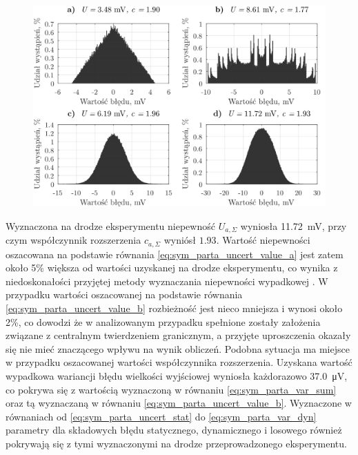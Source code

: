 \begin{figure}[htb!]
\begin{center}
\includegraphics{obrazki/hist_part_a}
\end{center}
\end{figure}

Wyznaczona na drodze eksperymentu niepewność $U_{a,\Sigma}$ wyniosła \qty{11.72}{mV}, przy czym współczynnik rozszerzenia $c_{a,\Sigma}$ wyniósł $1.93$. Wartość niepewności oszacowana na podstawie równania \eqref{eq:sym_parta_uncert_value_a} jest zatem około 5\% większa od wartości uzyskanej na drodze eksperymentu, co wynika z niedoskonałości przyjętej metody wyznaczania niepewności wypadkowej \cite{jakubiec_system}. W przypadku wartości oszacowanej na podstawie równania \eqref{eq:sym_parta_uncert_value_b} rozbieżność jest nieco mniejsza i wynosi około 2\%, co dowodzi że w analizowanym przypadku spełnione zostały założenia związane z centralnym twierdzeniem granicznym, a przyjęte uproszczenia okazały się nie mieć znaczącego wpływu na wynik obliczeń. Podobna sytuacja ma miejsce w przypadku oszacowanej wartości współczynnika rozszerzenia. Uzyskana wartość wypadkowa wariancji błędu wielkości wyjściowej wyniosła każdorazowo \qty{37.0}{\micro V}, co pokrywa się z wartością wyznaczoną w równaniu \eqref{eq:sym_parta_var_sum} oraz tą wyznaczaną w równaniu \eqref{eq:sym_parta_uncert_value_b}. Wyznaczone w równaniach od \eqref{eq:sym_parta_uncert_stat} do \eqref{eq:sym_parta_var_dyn} parametry dla składowych błędu statycznego, dynamicznego i losowego również pokrywają się z tymi wyznaczonymi na drodze przeprowadzonego eksperymentu.

